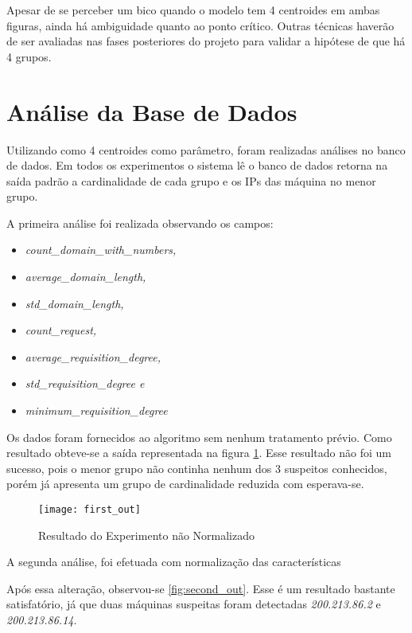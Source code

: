Apesar de se perceber um bico quando o modelo tem 4 centroides em ambas figuras, ainda há ambiguidade quanto ao ponto crítico. Outras técnicas haverão de ser avaliadas nas fases posteriores do projeto para validar a hipótese de que há 4 grupos.

\section{Análise da Base de Dados}

Utilizando como 4 centroides como parâmetro, foram realizadas análises no banco de dados. Em todos os experimentos o sistema lê o banco de dados retorna na saída padrão a cardinalidade de cada grupo e os IPs das máquina no menor grupo.

A primeira análise foi realizada observando os campos:

\begin{itemize}
\item \textit{count\_domain\_with\_numbers, }
\item \textit{average\_domain\_length, }
\item \textit{std\_domain\_length, }
\item \textit{count\_request, }
\item \textit{average\_requisition\_degree, }
\item \textit{std\_requisition\_degree e }
\item \textit{minimum\_requisition\_degree }
\end{itemize}

Os dados foram fornecidos ao algoritmo sem nenhum tratamento prévio. Como resultado obteve-se a saída representada na figura \ref{fig:first_out}. Esse resultado não foi um sucesso, pois o menor grupo não continha nenhum dos 3 suspeitos conhecidos, porém já apresenta um grupo de cardinalidade reduzida com esperava-se.

\begin{figure}[htbp]
\centering
\texttt{[image: first\_out]}
\caption[Resultado do Experimento não Normalizado]{Resultado do Experimento não Normalizado} \label{fig:first_out}
\end{figure}

A segunda análise, foi efetuada com normalização das características

Após essa alteração, observou-se \ref{fig:second_out}. Esse é um resultado bastante satisfatório, já que duas máquinas suspeitas foram detectadas \textit{200.213.86.2} e \textit{200.213.86.14}.

